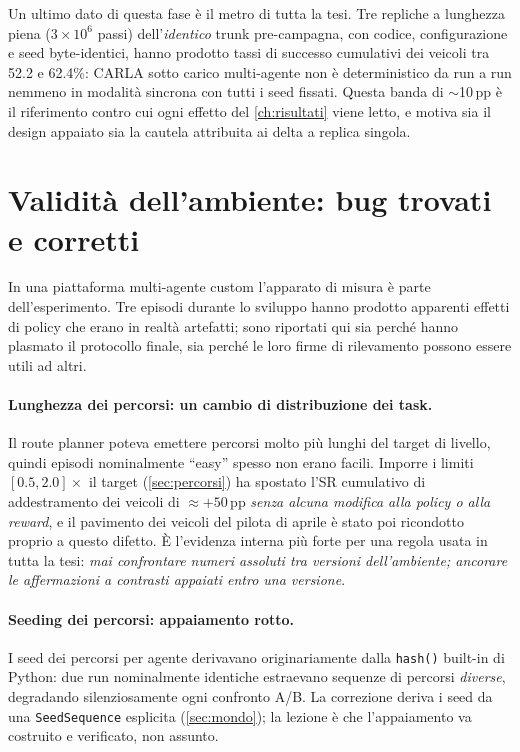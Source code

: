 Un ultimo dato di questa fase è il metro di tutta la tesi. Tre repliche
a lunghezza piena ($3\times10^{6}$ passi) dell'\emph{identico} trunk
pre-campagna, con codice, configurazione e seed byte-identici, hanno
prodotto tassi di successo cumulativi dei veicoli tra 52.2 e 62.4\%:
CARLA sotto carico multi-agente non è deterministico da run a run
nemmeno in modalità sincrona con tutti i seed fissati. Questa banda di
$\sim$10\,pp è il riferimento contro cui ogni effetto del
\cref{ch:risultati} viene letto, e motiva sia il design appaiato sia la
cautela attribuita ai delta a replica singola.

\section{Validità dell'ambiente: bug trovati e corretti}
\label{sec:validita}

In una piattaforma multi-agente custom l'apparato di misura è parte
dell'esperimento. Tre episodi durante lo sviluppo hanno prodotto
apparenti effetti di policy che erano in realtà artefatti; sono
riportati qui sia perché hanno plasmato il protocollo finale, sia perché
le loro firme di rilevamento possono essere utili ad altri.

\paragraph{Lunghezza dei percorsi: un cambio di distribuzione dei task.}
Il route planner poteva emettere percorsi molto più lunghi del target di
livello, quindi episodi nominalmente ``easy'' spesso non erano facili.
Imporre i limiti $[0.5, 2.0]\times$ il target (\cref{sec:percorsi}) ha
spostato l'SR cumulativo di addestramento dei veicoli di
$\approx +50$\,pp \emph{senza alcuna modifica alla policy o alla
reward}, e il pavimento dei veicoli del pilota di aprile è stato poi
ricondotto proprio a questo difetto. È l'evidenza interna più forte per
una regola usata in tutta la tesi: \emph{mai confrontare numeri assoluti
tra versioni dell'ambiente; ancorare le affermazioni a contrasti
appaiati entro una versione}.

\paragraph{Seeding dei percorsi: appaiamento rotto.}
I seed dei percorsi per agente derivavano originariamente dalla
\texttt{hash()} built-in di Python: due run nominalmente identiche 
estraevano sequenze di percorsi \emph{diverse}, degradando silenziosamente 
ogni confronto A/B. La correzione deriva i seed da una \texttt{SeedSequence} 
esplicita (\cref{sec:mondo}); la lezione è che l'appaiamento va costruito e 
verificato, non assunto.

